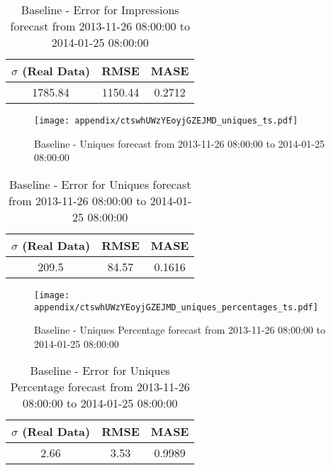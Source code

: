 \begin{table}[H]
\centering
\footnotesize
\begin{tabular}{ccc}
$\sigma$ (Real Data) & RMSE & MASE   \\ \hline
1785.84 & 1150.44 & 0.2712 \\
\end{tabular}

\vspace{0.5cm}

\caption{
Baseline - Error for Impressions forecast from 2013-11-26 08:00:00 to 2014-01-25 08:00:00}
\end{table}

\begin{figure}[H] \begin{center} \leavevmode
\texttt{[image: appendix/ctswhUWzYEoyjGZEJMD\_uniques\_ts.pdf]} \caption{
Baseline - Uniques forecast from 2013-11-26 08:00:00 to 2014-01-25 08:00:00} \label{fig:appendix/ctswhUWzYEoyjGZEJMD_uniques_ts.pdf} \end{center}
\end{figure}

\begin{table}[H]
\centering
\footnotesize
\begin{tabular}{ccc}
$\sigma$ (Real Data) & RMSE & MASE   \\ \hline
209.5 & 84.57 & 0.1616 \\
\end{tabular}

\vspace{0.5cm}

\caption{
Baseline - Error for Uniques forecast from 2013-11-26 08:00:00 to 2014-01-25 08:00:00}
\end{table}

\begin{figure}[H] \begin{center} \leavevmode
\texttt{[image: appendix/ctswhUWzYEoyjGZEJMD\_uniques\_percentages\_ts.pdf]} \caption{
Baseline - Uniques Percentage forecast from 2013-11-26 08:00:00 to 2014-01-25 08:00:00} \label{fig:appendix/ctswhUWzYEoyjGZEJMD_uniques_percentages_ts.pdf} \end{center}
\end{figure}

\begin{table}[H]
\centering
\footnotesize
\begin{tabular}{ccc}
$\sigma$ (Real Data) & RMSE & MASE   \\ \hline
2.66 & 3.53 & 0.9989 \\
\end{tabular}

\vspace{0.5cm}

\caption{
Baseline - Error for Uniques Percentage forecast from 2013-11-26 08:00:00 to 2014-01-25 08:00:00}
\end{table}

